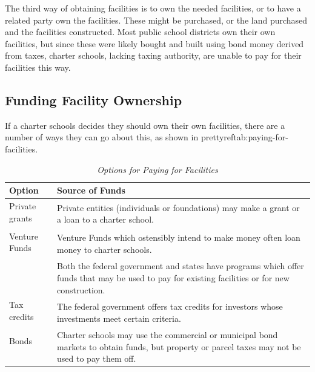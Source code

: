 The third way of obtaining facilities is to own the needed facilities, or to have a related party own the facilities. These might be purchased, or the land purchased and the facilities constructed. Most public school districts own their own facilities, but since these were likely bought and built using bond money derived from taxes, charter schools, lacking taxing authority, are unable to pay for their facilities this way.

\subsection{Funding Facility Ownership}\label{sec:funding-facilities}\indent

If a charter schools decides they should own their own facilities, there are a number of ways they can go about this, as shown in prettyref{tab:paying-for-facilities}.

\begin{table}[ht]
  \small\OnehalfSpacing%
  \caption[Options for Paying for Facilities]{\textit{Options for Paying for Facilities}}\label{tab:paying-for-facilities}%
  \begin{tabular}{ll}
    \toprule%
    Option    & Source of Funds \\
    \midrule%
    \protect\medskip%
    Private grants & \multirow[t]{2}{4.25in}{Private entities (individuals or foundations) may make a grant or a loan to  a charter school.}\\\\ %
    \protect\medskip%
    Venture Funds & \multirow[t]{2}{4.25in}{Venture Funds which ostensibly intend to make money often loan money to charter schools.}\\\\
    \protect\medskip%
    \multirow[t]{3}{1.25in}{Federal or State grants} & \multirow[t]{3}{4.25in}{Both the federal government and states have programs which offer funds that may be used to pay for existing facilities or for new construction.}\\\\\\
    \protect\medskip%
    Tax credits & \multirow[t]{2}{4.25in}{The federal government offers tax credits for investors whose investments meet
certain criteria.}\\\\
    Bonds & \multirow[t]{3}{4.25in}{Charter schools may use the commercial or municipal bond markets to obtain funds, but property or parcel taxes may not be used to pay them off.}\\\\\\
    \bottomrule%
  \end{tabular}
\end{table}

